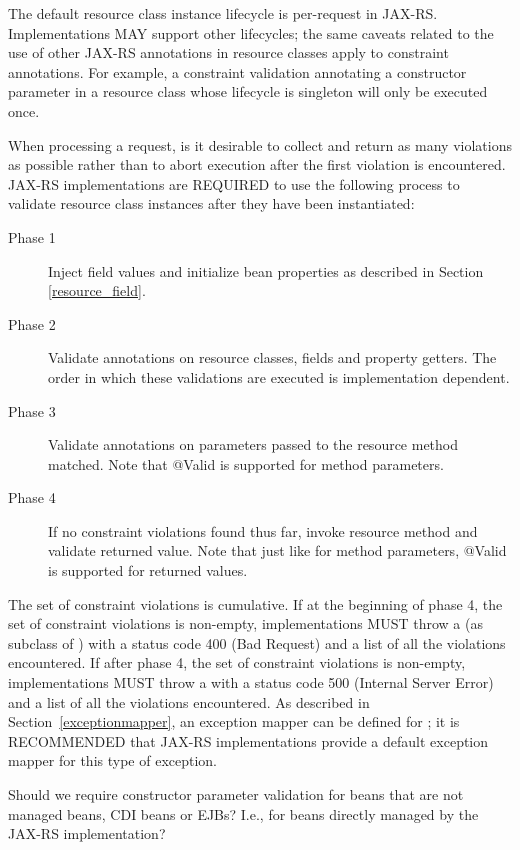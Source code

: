 The default resource class instance lifecycle is per-request in JAX-RS. Implementations MAY support other lifecycles; the same caveats related to the use of other JAX-RS annotations in resource classes apply to constraint annotations. For example, a constraint validation annotating a constructor parameter in a resource class whose lifecycle is singleton will only be executed once.

When processing a request, is it desirable to collect and return as many violations as possible rather than to abort execution after the first violation is encountered. JAX-RS implementations are REQUIRED to use the following process to validate resource class instances after they have been instantiated:

\begin{description}
\item[Phase 1] Inject field values and initialize bean properties as described in Section \ref{resource_field}.
\item[Phase 2] Validate annotations on resource classes, fields and property getters. The order in which these validations are executed is implementation dependent.
\item[Phase 3] Validate annotations on parameters passed to the resource method matched. Note that @Valid is supported for method parameters.
\item[Phase 4] If no constraint violations found thus far, invoke resource method and validate returned value. Note that just like for method parameters, @Valid is supported for returned values.
\end{description}

The set of constraint violations is cumulative. If at the beginning of phase 4, the set of constraint violations is non-empty, implementations MUST throw a  (as subclass of \WebAppExc) with a status code 400 (Bad Request) and a list of all the violations encountered. If after phase 4, the set of constraint violations is non-empty, implementations MUST throw a  with a status code 500 (Internal Server Error) and a list of all the violations encountered. As described in Section~\ref{exceptionmapper}, an exception mapper can be defined for ; it is RECOMMENDED that JAX-RS implementations provide a default exception mapper for this type of exception.

\begin{ednote}
Should we require constructor parameter validation for beans that are not managed beans, CDI beans or EJBs? I.e., for beans directly managed by the JAX-RS implementation?
\end{ednote}

